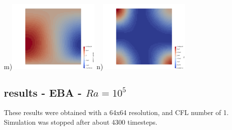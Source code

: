\begin{center}
m)\includegraphics[width=4.5cm]{python_codes/fieldstone_24/EBA_104/alpha_T_v_gradp.png}  
n)\includegraphics[width=4.5cm]{python_codes/fieldstone_24/EBA_104/Phi.png}
\end{center}



\newpage
\subsection*{results - EBA - $Ra=10^5$}

These results were obtained with a 64x64 resolution, and CFL number of 1. Simulation 
 was stopped after about 4300 timesteps. 


